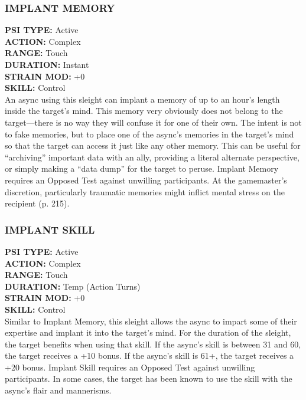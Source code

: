 \subsubsection{IMPLANT MEMORY} \textbf{PSI TYPE:} Active \\ \textbf{ACTION:} Complex \\ \textbf{RANGE:} Touch \\ \textbf{DURATION:} Instant \\ \textbf{STRAIN MOD:} +0 \\ \textbf{SKILL:} Control\\ An async using this sleight can implant a memory of up to an hour’s length inside the target’s mind. This memory very obviously does not belong to the target—there is no way they will confuse it for one of their own. The intent is not to fake memories, but to place one of the async’s memories in the target’s mind so that the target can access it just like any other memory. This can be useful for “archiving” important data with an ally, providing a literal alternate perspective, or simply making a “data dump” for the target to peruse. Implant Memory requires an Opposed Test against unwilling participants. At the gamemaster’s discretion, particularly traumatic memories might inflict mental stress on the recipient (p. 215). 

\subsubsection{IMPLANT SKILL} \textbf{PSI TYPE:} Active \\ \textbf{ACTION:} Complex \\ \textbf{RANGE:} Touch \\ \textbf{DURATION:} Temp (Action Turns) \\ \textbf{STRAIN MOD:} +0 \\ \textbf{SKILL:} Control\\ Similar to Implant Memory, this sleight allows the async to impart some of their expertise and implant it into the target’s mind. For the duration of the sleight, the target benefits when using that skill. If the async’s skill is between 31 and 60, the target receives a +10 bonus. If the async’s skill is 61+, the target receives a +20 bonus. Implant Skill requires an Opposed Test against unwilling participants. In some cases, the target has been known to use the skill with the async’s flair and mannerisms. 

